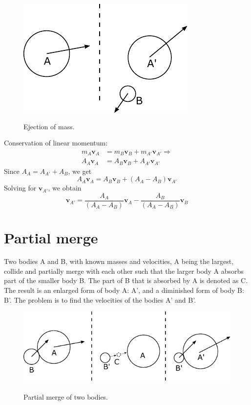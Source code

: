 \documentclass{article}
\newcommand{\vbs}[0]{\boldsymbol{v}}
\begin{document}
\begin{figure}[h]
	\centering
	{\includegraphics{figures/ejection.pdf}}
	\caption{Ejection of mass.}\label{fig:ejection}
\end{figure}

Conservation of linear momentum:
\begin{equation*}
\begin{split}
m_A\vbs_A &= m_B\vbs_B + m_{A'}\vbs_{A'}
\Rightarrow
\\A_A\vbs_A &= A_B\vbs_B + A_{A'}\vbs_{A'}
\end{split}
\end{equation*}
Since $A_A = A_{A'} + A_B$, we get
\begin{equation*}
A_A\vbs_A = A_B\vbs_B + (A_A - A_B)\vbs_{A'}
\end{equation*}
Solving for $\vbs_{A'}$, we obtain
\begin{equation}
\vbs_{A'} = \frac{A_A}{(A_A - A_B)}\vbs_A - \frac{A_B}{(A_A - A_B)}\vbs_B
\end{equation}

\section{Partial merge}
Two bodies A and B, with known masses and velocities, A being the largest, collide and partially merge with each other such that the larger body A absorbs part of the smaller body B. The part of B that is absorbed by A is denoted as C. The result is an enlarged form of body A: A', and a diminished form of body B: B'. The problem is to find the velocities of the bodies A' and B'.

\begin{figure}[h]
	\centering
	{\includegraphics{figures/partial_merge.pdf}}
	\caption{Partial merge of two bodies.}\label{fig:partial_merge}
\end{figure}
\end{document}
